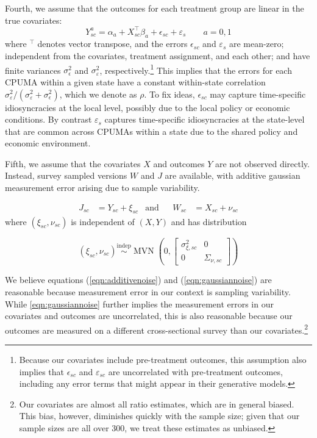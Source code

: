 \documentclass[aoas]{imsart}
\theoremstyle{plain}
\theoremstyle{remark}
\begin{document}
Fourth, we assume that the outcomes for each treatment group are linear in the true covariates:
\begin{equation}\label{eqn:linmod}
Y_{sc}^a = \alpha_a + X_{sc}^\top\beta_a + \epsilon_{sc} + \varepsilon_s \qquad a = 0, 1
\end{equation}
%
where $^\top$ denotes vector transpose, and the errors $\epsilon_{sc}$ and $\varepsilon_{s}$ are mean-zero; independent from the covariates, treatment assignment, and each other; and have finite variances $\sigma^2_{\epsilon}$ and $\sigma^2_{\varepsilon}$, respectively.\footnote{Because our covariates include pre-treatment outcomes, this assumption also implies that $\epsilon_{sc}$ and $\varepsilon_{sc}$ are uncorrelated with pre-treatment outcomes, including any error terms that might appear in their generative models.} This implies that the errors for each CPUMA within a given state have a constant within-state correlation $\sigma^2_{\varepsilon}/(\sigma^2_{\varepsilon} + \sigma^2_{\epsilon})$, which we denote as $\rho$. To fix ideas, $\epsilon_{sc}$ may capture time-specific idiosyncracies at the local level, possibly due to the local policy or economic conditions. By contrast $\varepsilon_s$ captures time-specific idiosyncracies at the state-level that are common across CPUMAs within a state due to the shared policy and economic environment.

Fifth, we assume that the covariates $X$ and outcomes $Y$ are not observed directly. Instead, survey sampled versions $W$ and $J$ are available, with additive gaussian measurement error arising due to sample variability.

\begin{align} \label{eqn:additivenoise}
	J_{sc} & = Y_{sc} + \xi_{sc} & \text{and} & & W_{sc} & = X_{sc} + \nu_{sc}
\end{align}
where $(\xi_{sc}, \nu_{sc})$ is independent of $(X, Y)$ and has distribution

\begin{equation} \label{eqn:gaussiannoise}
 (\xi_{sc}, \nu_{sc}) \stackrel{\text{indep}}{\sim} \operatorname{MVN}\left(0, \left[\begin{array}{cc} \sigma_{\xi,sc}^2 & 0 \\ 0 & \Sigma_{\nu, sc} \end{array}\right] \right)
\end{equation}

We believe equations (\ref{eqn:additivenoise}) and (\ref{eqn:gaussiannoise}) are reasonable because measurement error in our context is sampling variability. While \eqref{eqn:gaussiannoise} further implies the measurement errors in our covariates and outcomes are uncorrelated, this is also reasonable because our outcomes are measured on a different cross-sectional survey than our covariates.\footnote{Our covariates are almost all ratio estimates, which are in general biased. This bias, however, diminishes quickly with the sample size; given that our sample sizes are all over 300, we treat these estimates as unbiased.} 
\end{document}
